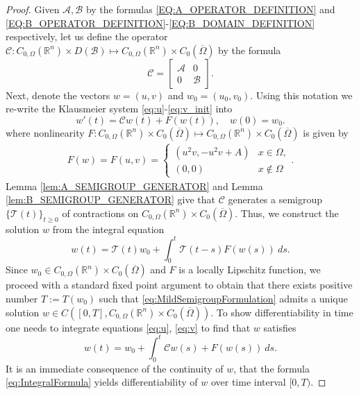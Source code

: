 \documentclass[12pt, a4paper]{article}
\theoremstyle{break}
\theoremstyle{break}
\theoremstyle{break}
\theoremstyle{break}
\theoremstyle{break}
\theoremstyle{break}
\theoremstyle{break}
\begin{document}
\begin{proof}
    Given $\mathcal{A}, \mathcal{B}$ by the formulas \eqref{EQ:A_OPERATOR_DEFINITION} and \eqref{EQ:B_OPERATOR_DEFINITION}-\eqref{EQ:B_DOMAIN_DEFINITION} respectively, let us define the operator $\mathcal{C}: C_{0, \Omega}(\mathbb{R}^n) \times D(\mathcal{B}) \mapsto C_{0, \Omega}(\mathbb{R}^n) \times C_0(\overline{\Omega})$ by the formula
    \begin{equation}
        \mathcal{C} = 
        \begin{bmatrix}
            \mathcal{A} & 0\\ 0 & \mathcal{B}
        \end{bmatrix}.
    \end{equation}
    Next, denote the vectors $w = (u, v)$ and $w_0 = (u_0, v_0)$. Using this notation we re-write the Klausmeier system \eqref{eq:u}-\eqref{eq:v_init} into
    \begin{equation}
        \label{eq:ClassicalSemigroupFormulation}
         w'(t) = \mathcal{C} w(t) + F(w(t)), \quad w(0) = w_0.
    \end{equation}
    where nonlinearity $F: C_{0, \Omega}(\mathbb{R}^n) \times C_0(\overline{\Omega}) \mapsto C_{0, \Omega}(\mathbb{R}^n) \times C_0(\overline{\Omega})$ is given by
    \begin{align}
        F(w) = F(u, v) = 
        \begin{cases}
            (u^2 v, -u^2 v + A) &x \in \Omega, \\
            (0, 0) &x \notin \Omega
        \end{cases}.
    \end{align}
    Lemma \ref{lem:A_SEMIGROUP_GENERATOR} and Lemma \ref{lem:B_SEMIGROUP_GENERATOR} give that $\mathcal{C}$ generates a semigroup $\{\mathcal{T}(t)\}_{t \geq 0}$ of contractions on $C_{0, \Omega}(\mathbb{R}^n) \times C_0(\overline{\Omega})$. Thus, we construct the solution $w$ from the integral equation
    \begin{equation}
        \label{eq:MildSemigroupFormulation}
         w(t) = \mathcal{T}(t) w_0 + \int_0^t \mathcal{T}(t-s) F(w(s)) \:ds.
    \end{equation}
    Since $w_0 \in C_{0, \Omega}(\mathbb{R}^n) \times C_0(\overline{\Omega})$ and $F$ is a locally Lipschitz function, we proceed with a standard fixed point argument to obtain that there exists positive number $T := T(w_0)$ such that \eqref{eq:MildSemigroupFormulation} admits a unique solution $w \in C\left([0, T], C_{0, \Omega}(\mathbb{R}^n) \times C_0(\overline{\Omega})\right)$. To show differentiability in time one needs to integrate equations \eqref{eq:u}, \eqref{eq:v} to find that $w$ satisfies
    \begin{equation}
        \label{eq:IntegralFormula}
        w(t) = w_0 + \int_0^t \mathcal{C}w(s) + F(w(s)) \:ds.
    \end{equation}
    It is an immediate consequence of the continuity of $w$, that the formula \eqref{eq:IntegralFormula} yields differentiability of $w$ over time interval $[0, T)$.
\end{proof}
\end{document}
